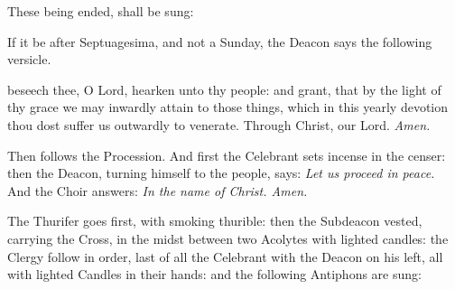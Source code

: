 



\begin{rubric}
    These being ended, shall be sung:
\end{rubric}




\begin{rubric}
    If it be after Septuagesima, and not a Sunday, the Deacon says the following versicle.
\end{rubric}

 beseech thee, O Lord, hearken unto thy people: and grant, that by the light of thy grace we may inwardly attain to those things, which in this yearly devotion thou dost suffer us outwardly to venerate. Through Christ, our Lord. \textit{Amen.}

\begin{rubric}
    Then follows the Procession. And first the Celebrant sets incense in the censer: then the Deacon, turning himself to the people, says: \emph{Let us proceed in peace.} And the Choir answers: \emph{In the name of Christ. Amen.}
\end{rubric}

\begin{rubric}
    The Thurifer goes first, with smoking thurible: then the Subdeacon vested, carrying the Cross, in the midst between two Acolytes with lighted candles: the Clergy follow in order, last of all the Celebrant with the Deacon on his left, all with lighted Candles in their hands: and the following Antiphons are sung:
\end{rubric}

